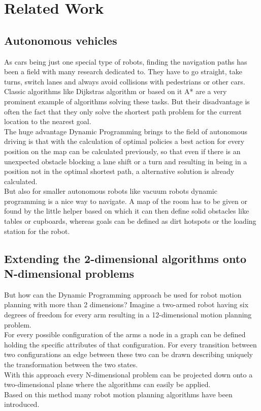 \documentclass[conference]{IEEEtran}
\begin{document}
\section{Related Work}
\subsection{Autonomous vehicles}
As cars being just one special type of robots, finding the navigation paths has been a field with many research dedicated to. They have to go straight, take turns, switch lanes and always avoid collisions with pedestrians or other cars.\\
Classic algorithms like Dijkstras algorithm or based on it A* are a very prominent example of algorithms solving these tasks. But their disadvantage is often the fact that they only solve the shortest path problem for the current location to the nearest goal.\\
The huge advantage Dynamic Programming brings to the field of autonomous driving is that with the calculation of optimal policies a best action for every position on the map can be calculated previously, so that even if there is an unexpected obstacle blocking a lane shift or a turn and resulting in being in a position not in the optimal shortest path, a alternative solution is already calculated.\\
But also for smaller autonomous robots like vacuum robots dynamic programming is a nice way to navigate. A map of the room has to be given or found by the little helper based on which it can then define solid obstacles like tables or cupboards, whereas goals can be defined as dirt hotspots or the loading station for the robot.\\


\subsection{Extending the 2-dimensional algorithms onto N-dimensional problems}
But how can the Dynamic Programming approach be used for robot motion planning with more than 2 dimensions? Imagine a two-armed robot having six degrees of freedom for every arm resulting in a 12-dimensional motion planning problem.\\
For every possible configuration of the arms a node in a graph can be defined holding the specific attributes of that configuration. For every transition between two configurations an edge between these two can be drawn describing uniquely the transformation between the two states.\\
With this approach every N-dimensional problem can be projected down onto a two-dimensional plane where the algorithms can easily be applied.\\
Based on this method many robot motion planning algorithms have been introduced.
\end{document}
